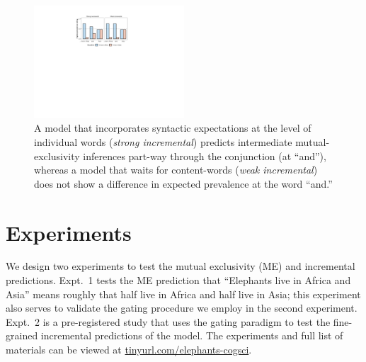 \documentclass[10pt,letterpaper]{article}
\providecommand{\tightlist}{%
  \setlength{\itemsep}{0pt}\setlength{\parskip}{0pt}}
\newcommand{\denote}[1]{\mbox{ $[\![ #1 ]\!]$}}
\begin{document}
\begin{figure}[t]
  \centering
    \includegraphics[width=0.5\textwidth]{incremental}
    \vspace{-0.5cm}
  \caption{A model that incorporates syntactic expectations at the level of individual words (\emph{strong incremental}) predicts intermediate mutual-exclusivity inferences part-way through the conjunction (at ``and''), whereas a model that waits for content-words (\emph{weak incremental}) does not show a difference in expected prevalence at the word ``and.''
  }
          \vspace{-0.3cm}
  \label{fig:incremental}
\end{figure}


%


\section{Experiments}

We design two experiments to test the mutual exclusivity (ME) and incremental predictions.
Expt.~1 tests the ME prediction that ``Elephants live in Africa and Asia'' means roughly that half live in Africa and half live in Asia; this experiment also serves to validate the gating procedure we employ in the second experiment. 
Expt.~2 is a pre-registered study that uses the gating paradigm to test the fine-grained incremental predictions of the model.
The experiments and full list of materials can be viewed at \url{tinyurl.com/elephants-cogsci}.
\end{document}
